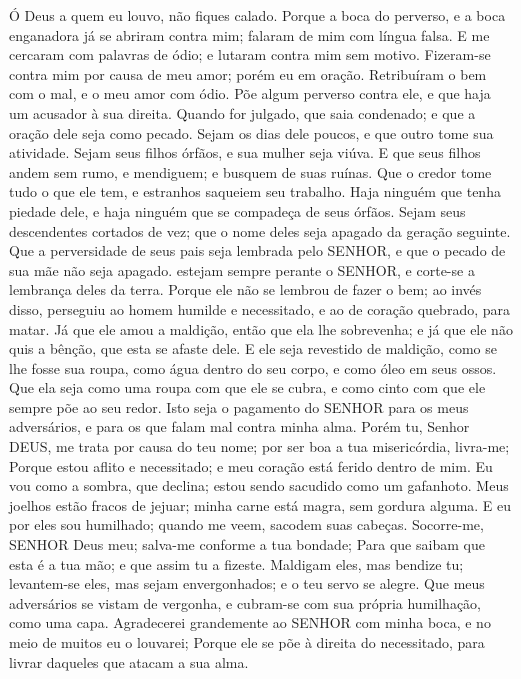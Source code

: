 
{\PP 
  Ó Deus a quem eu louvo, não fiques calado.
  Porque a boca do perverso, e a boca enganadora já se abriram contra mim; falaram de mim com língua falsa.
  E me cercaram com palavras de ódio; e lutaram contra mim sem motivo.
  Fizeram-se contra mim por causa de meu amor; porém eu
{} em oração.
  Retribuíram o bem com o mal, e o meu amor com ódio.
  Põe algum perverso contra ele, e que haja um acusador à sua direita.
  Quando for julgado, que saia condenado; e que a oração dele seja
{} como pecado.
  Sejam os dias dele poucos, e que outro tome sua atividade.
  Sejam seus filhos órfãos, e sua mulher seja viúva.
  E que seus filhos andem sem rumo, e mendiguem; e busquem
{} de suas ruínas.
  Que o credor tome tudo o que ele tem, e estranhos saqueiem seu trabalho.
  Haja ninguém que tenha piedade dele, e haja ninguém que se compadeça de seus órfãos.
  Sejam seus descendentes cortados de vez;
{} que o nome deles seja apagado da geração seguinte.
  Que a perversidade de seus pais seja lembrada pelo SENHOR, e que o pecado de sua mãe não seja apagado.
   estejam sempre perante o SENHOR, e corte-se a lembrança deles da terra.
  Porque ele não se lembrou de fazer o bem; ao invés disso, perseguiu ao homem humilde e necessitado, e ao de coração quebrado, para
{} matar.
  Já que ele amou a maldição, então que ela lhe sobrevenha; e já que ele não quis a bênção, que esta se afaste dele.
  E ele seja revestido de maldição, como se lhe fosse sua roupa, como água dentro do seu corpo, e como óleo em seus ossos.
  Que ela seja como uma roupa com que ele se cubra, e como cinto com que ele sempre põe ao seu redor.
  Isto seja o pagamento do SENHOR para os meus adversários, e para os que falam mal contra minha alma.
  Porém tu, Senhor DEUS, me trata
{} por causa do teu nome; por ser boa a tua misericórdia, livra-me;
  Porque estou aflito e necessitado; e meu coração está ferido dentro de mim.
  Eu vou como a sombra, que declina; estou sendo sacudido como um gafanhoto.
  Meus joelhos estão fracos de
{} jejuar; minha carne está magra, sem gordura alguma.
  E eu por eles sou humilhado; quando me veem, sacodem suas cabeças.
  Socorre-me, SENHOR Deus meu; salva-me conforme a tua bondade;
  Para que saibam que esta é a tua mão; e que assim tu a fizeste.
  Maldigam eles, mas bendize tu; levantem-se eles, mas sejam envergonhados; e o teu servo se alegre.
  Que meus adversários se vistam de vergonha, e cubram-se com sua própria humilhação, como
{} uma capa.
  Agradecerei grandemente ao SENHOR com minha boca, e no meio de muitos eu o louvarei;
  Porque ele se põe à direita do necessitado, para
{} livrar daqueles que atacam a sua alma.
\par }

